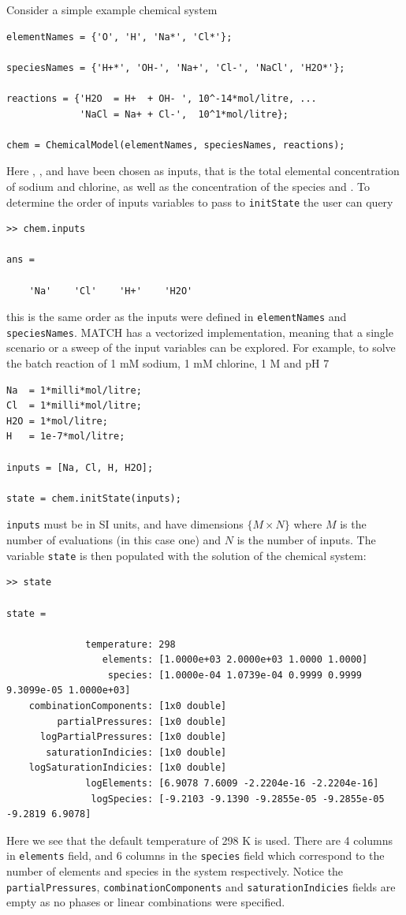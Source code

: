 \documentclass{article}
\begin{document}
Consider a simple example chemical system
\begin{lstlisting}
elementNames = {'O', 'H', 'Na*', 'Cl*'};

speciesNames = {'H+*', 'OH-', 'Na+', 'Cl-', 'NaCl', 'H2O*'};

reactions = {'H2O  = H+  + OH- ', 10^-14*mol/litre, ...
             'NaCl = Na+ + Cl-',  10^1*mol/litre};

chem = ChemicalModel(elementNames, speciesNames, reactions);
\end{lstlisting}
Here , ,  and  have been chosen as inputs, that is the total elemental concentration of sodium and chlorine, as well as the concentration of the species  and . To determine the order of inputs variables to pass to \verb|initState| the user can query 

\begin{lstlisting}
>> chem.inputs

ans = 

    'Na'    'Cl'    'H+'    'H2O'
\end{lstlisting}
this is the same order as the inputs were defined in \verb|elementNames| and \verb|speciesNames|. MATCH has a vectorized implementation, meaning that a single scenario or a sweep of the input variables can be explored.  For example, to solve the batch reaction of 1 mM sodium, 1 mM chlorine, 1 M  and pH 7

\begin{lstlisting}
Na  = 1*milli*mol/litre;
Cl  = 1*milli*mol/litre;
H2O = 1*mol/litre;
H   = 1e-7*mol/litre;

inputs = [Na, Cl, H, H2O];

state = chem.initState(inputs);
\end{lstlisting}
\verb|inputs| must be in SI units, and have dimensions $\{M\times N\}$ where $M$ is the number of evaluations (in this case one) and $N$ is the number of inputs. The variable \verb|state| is then populated with the solution of the chemical system:

\begin{lstlisting}
>> state

state = 

              temperature: 298
                 elements: [1.0000e+03 2.0000e+03 1.0000 1.0000]
                  species: [1.0000e-04 1.0739e-04 0.9999 0.9999 9.3099e-05 1.0000e+03]
    combinationComponents: [1x0 double]
         partialPressures: [1x0 double]
      logPartialPressures: [1x0 double]
       saturationIndicies: [1x0 double]
    logSaturationIndicies: [1x0 double]
              logElements: [6.9078 7.6009 -2.2204e-16 -2.2204e-16]
               logSpecies: [-9.2103 -9.1390 -9.2855e-05 -9.2855e-05 -9.2819 6.9078]
\end{lstlisting}
Here we see that the default temperature of 298 \textdegree K is used. There are 4 columns in \verb|elements| field, and 6 columns in the \verb|species| field which correspond to the number of elements and species in the system respectively. Notice the \verb|partialPressures|, \verb|combinationComponents| and \verb|saturationIndicies| fields are empty as no phases or linear combinations were specified. 
\end{document}
